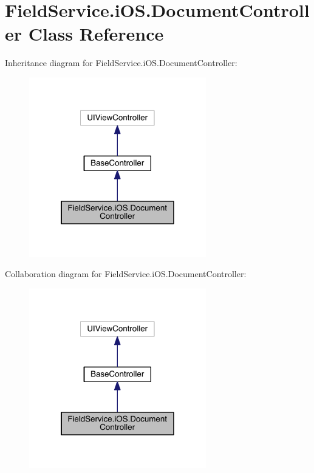\hypertarget{class_field_service_1_1i_o_s_1_1_document_controller}{\section{Field\+Service.\+i\+O\+S.\+Document\+Controller Class Reference}
\label{class_field_service_1_1i_o_s_1_1_document_controller}
}


Inheritance diagram for Field\+Service.\+i\+O\+S.\+Document\+Controller\+:
\nopagebreak
\begin{figure}[H]
\begin{center}
\leavevmode
\includegraphics[width=218pt]{class_field_service_1_1i_o_s_1_1_document_controller__inherit__graph}
\end{center}
\end{figure}


Collaboration diagram for Field\+Service.\+i\+O\+S.\+Document\+Controller\+:
\nopagebreak
\begin{figure}[H]
\begin{center}
\leavevmode
\includegraphics[width=218pt]{class_field_service_1_1i_o_s_1_1_document_controller__coll__graph}
\end{center}
\end{figure}

